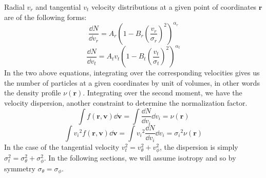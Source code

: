 Radial $v_r$ and tangential $v_t$ velocity distributions at a given point of
coordinates $\textbf{r}$ are of the following forms:
%
\begin{equation}
    \frac{\dd N}{\dd v_r} =
    A_r{\left(1-B_r{\left(\frac{v_r}{\sigma_r}\right)} ^2\right)}^{\alpha_r}
\end{equation}
%
\begin{equation}
    \frac{\dd N}{\dd v_t}=
    A_t v_t
    {\left(1-B_t{\left(\frac{v_t}{\sigma_t}\right)}^2\right)}^{\alpha_t}
\end{equation}
%
In the two above equations, integrating over the corresponding velocities
gives us the number of particles at a given coordinates by unit of volumes,
in other words the density profile $\nu\left(\textbf{r}\right)$. Integrating
over the second moment, we have the velocity dispersion, another constraint
to determine the normalization factor.
%
\begin{equation}
    \label{eq:mom0}
    \int f \left(\textbf{r},\textbf{v}\right)\dd\textbf{v}=
    \int\frac{\dd N}{\dd v_i}\dd v_i=
    \nu\left(\textbf{r}\right)
\end{equation}
%
\begin{equation}
    \int{v_i}^2 f \left(\textbf{r},\textbf{v}\right)\dd\textbf{v}=
    \int{v_i}^2\frac{\dd N}{\dd v_i}\dd v_i=
    {\sigma_i}^2\nu\left(\textbf{r}\right)
\end{equation}
%
In the case of the tangential velocity $v_t^2=v_\theta^2+v_\phi^2$, the
dispersion is simply $\sigma_t^2=\sigma_\theta^2+\sigma_\phi^2$. In the
following sections, we will assume isotropy and so by symmetry
$\sigma_\theta=\sigma_\phi$.

